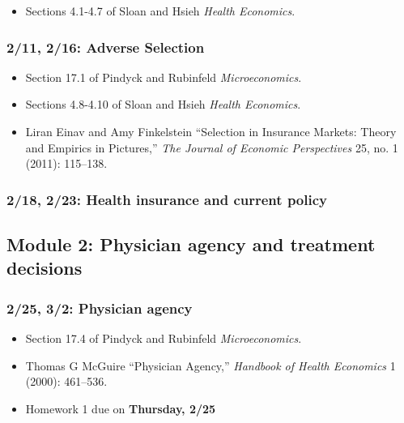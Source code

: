 \documentclass[11pt,]{article}
\providecommand{\tightlist}{%
  \setlength{\itemsep}{0pt}\setlength{\parskip}{0pt}}
\begin{document}
\begin{itemize}
\tightlist
\item
  Sections 4.1-4.7 of Sloan and Hsieh \emph{Health Economics}.
\end{itemize}

\hypertarget{adverse-selection}{%
\subsubsection{2/11, 2/16: Adverse Selection}\label{adverse-selection}}

\begin{itemize}
\tightlist
\item
  Section 17.1 of Pindyck and Rubinfeld \emph{Microeconomics}.
\item
  Sections 4.8-4.10 of Sloan and Hsieh \emph{Health Economics}.
\item
  Liran Einav and Amy Finkelstein ``Selection in Insurance Markets:
  Theory and Empirics in Pictures,'' \emph{The Journal of Economic
  Perspectives} 25, no. 1 (2011): 115--138.
\end{itemize}

\hypertarget{health-insurance-and-current-policy}{%
\subsubsection{2/18, 2/23: Health insurance and current
policy}\label{health-insurance-and-current-policy}}

\hypertarget{module-2-physician-agency-and-treatment-decisions}{%
\subsection{Module 2: Physician agency and treatment
decisions}\label{module-2-physician-agency-and-treatment-decisions}}

\hypertarget{physician-agency}{%
\subsubsection{2/25, 3/2: Physician agency}\label{physician-agency}}

\begin{itemize}
\tightlist
\item
  Section 17.4 of Pindyck and Rubinfeld \emph{Microeconomics}.
\item
  Thomas G McGuire ``Physician Agency,'' \emph{Handbook of Health
  Economics} 1 (2000): 461--536.
\item
  Homework 1 due on \textbf{Thursday, 2/25}
\end{itemize}
\end{document}
